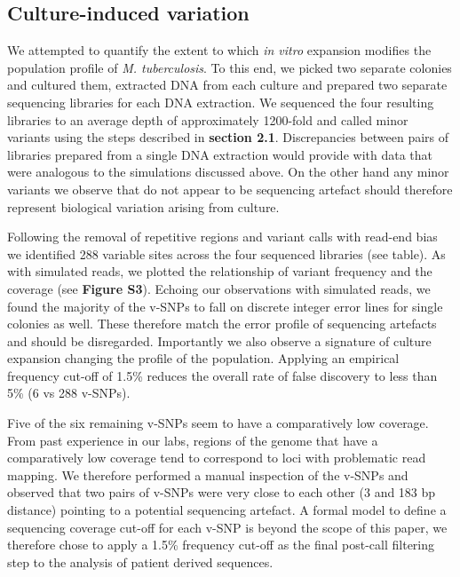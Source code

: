 \documentclass[12pt, oneside]{article}   	%
\begin{document}
\subsection{Culture-induced variation}
We attempted to quantify the extent to which \textsl{in vitro} expansion modifies the population profile of \textsl{M. tuberculosis}. To this end, we picked two separate colonies and cultured them, extracted DNA from each culture and prepared two separate sequencing libraries for each DNA extraction. We sequenced the four resulting libraries to an average depth of approximately 1200-fold and called minor variants using the steps described in \textbf{section 2.1}. Discrepancies between pairs of libraries prepared from a single DNA extraction would provide with data that were analogous to the simulations discussed above. On the other hand any minor variants we observe that do not appear to be sequencing artefact should therefore represent biological variation arising from culture.

Following the removal of repetitive regions and variant calls with read-end bias we identified 288 variable sites across the four sequenced libraries (see table). As with simulated reads, we plotted the relationship of variant frequency and the coverage (see \textbf{Figure S3}). Echoing our observations with simulated reads, we found the majority of the v-SNPs to fall on discrete integer error lines for single colonies as well. These therefore match the error profile of sequencing artefacts and should be disregarded. Importantly we also observe a signature of culture expansion changing the profile of the population. Applying an empirical frequency cut-off of 1.5\% reduces the overall rate of false discovery to less than 5\% (6 vs 288 v-SNPs).

Five of the six remaining v-SNPs seem to have a comparatively low coverage. From past experience in our labs, regions of the genome that have a comparatively low coverage tend to correspond to loci with problematic read mapping. We therefore performed a manual inspection of the v-SNPs and observed that two pairs of v-SNPs were very close to each other (3 and 183 bp distance) pointing to a potential sequencing artefact. A formal model to define a sequencing coverage cut-off for each v-SNP is beyond the scope of this paper, we therefore chose to apply a 1.5\% frequency cut-off as the final post-call filtering step to the analysis of patient derived sequences.
\end{document}
